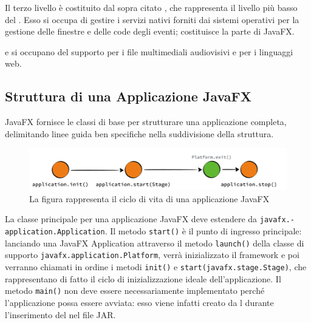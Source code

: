             Il terzo livello è costituito dal sopra citato , che rappresenta il livello più basso del .
            Esso si occupa di gestire i servizi nativi forniti dai sistemi operativi per la gestione delle finestre e delle code degli eventi; costituisce la parte  di JavaFX.

             e  si occupano del supporto per i file multimediali audiovisivi e per i linguaggi web.

        \subsection{Struttura di una Applicazione JavaFX}\label{sub:jfxStruttura}

            JavaFX fornisce le classi di base per strutturare una applicazione completa, delimitando linee guida ben specifiche nella suddivisione della struttura.

            \begin{figure}[htbp]\label{fig:jfxLife}
                \centering
                \includegraphics[scale=1]{img/jfxLifecycle}
                \caption{La figura rappresenta il ciclo di vita di una applicazione JavaFX}
            \end{figure}


            La classe principale per una applicazione JavaFX deve estendere da \texttt{javafx\dothyp application\dothyp Application}. Il metodo \texttt{start()} è il punto di ingresso principale: lanciando una JavaFX Application attraverso il metodo \texttt{launch()} della classe di supporto \texttt{javafx\dothyp application\dothyp Platform}, verrà inizializzato il framework e poi verranno chiamati in ordine i metodi \texttt{init()} e \texttt{start(javafx\dothyp stage\dothyp Stage)}, che rappresentano di fatto il ciclo di inizializzazione ideale dell'applicazione.
            Il metodo \texttt{main()} non deve essere necessariamente implementato perché l'applicazione possa essere avviata: esso viene infatti creato da l durante l'inserimento del  nel file JAR.

